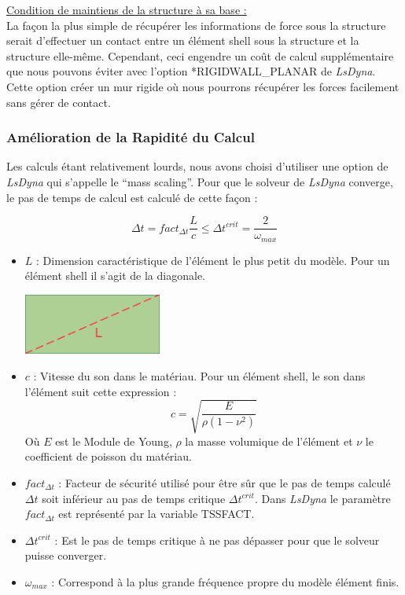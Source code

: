 \documentclass[a4paper]{article}
\begin{document}
	\underline{Condition de maintiens de la structure à sa base :}\\
	
	La façon la plus simple de récupérer les informations de force sous la structure serait d'effectuer un contact entre un élément shell sous la structure et la structure elle-même. Cependant, ceci engendre un coût de calcul supplémentaire que nous pouvons éviter avec l'option *RIGIDWALL\_PLANAR de \textit{LsDyna}. Cette option créer un mur rigide où nous pourrons récupérer les forces facilement sans gérer de contact.
	
	\subsubsection{Amélioration de la Rapidité du Calcul}
	\hspace{0.5cm}Les calculs étant relativement lourds, nous avons choisi d’utiliser une option de \textit{LsDyna} qui s’appelle le “mass scaling”. Pour que le solveur de \textit{LsDyna} converge, le pas de temps de calcul est calculé de cette façon \cite{LS_TIMESTEP} :
	
	\begin{equation}
		\Delta t = fact_{\Delta t} \frac{L}{c} \leq \Delta t ^{crit} = \frac{2}{\omega_{max}}
		\label{dt_crit}
	\end{equation}
	
	\begin{itemize}
		\item $L$ : Dimension caractéristique de l'élément le plus petit du modèle. Pour un élément shell il s'agit de la diagonale.
		\begin{center}
			\includegraphics[height=2cm]{Images/8/8_2/shell_L.pdf}
		\end{center}
		\item $c$ : Vitesse du son dans le matériau. Pour un élément shell, le son dans l'élément suit cette expression :
		$$c = \sqrt{\frac{E}{\rho (1 - \nu^{2})}}$$
		Où $E$ est le Module de Young, $\rho$ la masse volumique de l'élément et $\nu$ le coefficient de poisson du matériau.
		\item $fact_{\Delta t}$ : Facteur de sécurité utilisé pour être sûr que le pas de temps calculé $\Delta t$ soit inférieur au pas de temps critique $\Delta t ^{crit}$. Dans \textit{LsDyna} le paramètre $fact_{\Delta t}$ est représenté par la variable TSSFACT.
		\item $\Delta t ^{crit}$ : Est le pas de temps critique à ne pas dépasser pour que le solveur puisse converger.
		\item $\omega_{max}$ : Correspond à la plus grande fréquence propre du modèle élément finis.
	\end{itemize}
	
\end{document}
